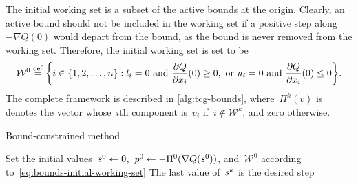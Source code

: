 The initial working set is a subset of the active bounds at the origin.
Clearly, an active bound should not be included in the working set if a positive step along~$-\nabla Q(0)$ would depart from the bound, as the bound is never removed from the working set.
Therefore, the initial working set is set to be
\begin{equation}
    \label{eq:bounds-initial-working-set}
    \mathcal{W}^0 \eqdef \set[\bigg]{i \in \set{1, 2, \dots, n} : \xl_i = 0 ~ \text{and} ~ \frac{\partial Q}{\partial \iter_i}(0) \ge 0, ~ \text{or} ~ \xu_i = 0 ~ \text{and} ~ \frac{\partial Q}{\partial \iter_i}(0) \le 0}.
\end{equation}
The complete framework is described in \cref{alg:tcg-bounds}, where~$\Pi^k(v)$ is denotes the vector whose~$i$th component is~$v_i$ if~$i \notin \mathcal{W}^k$, and zero otherwise.

\begin{algorithm}
    \caption{Bound-constrained  method}
    \label{alg:tcg-bounds}
    \DontPrintSemicolon
    \onehalfspacing
    Set the initial values~$\sstep[0] \gets 0$,~$\pstep[0] \gets -\Pi^0(\nabla Q(\sstep[0]))$, and~$\mathcal{W}^0$ according to~\cref{eq:bounds-initial-working-set}\;
    The last value of~$\sstep[k]$ is the desired step\;
\end{algorithm}

